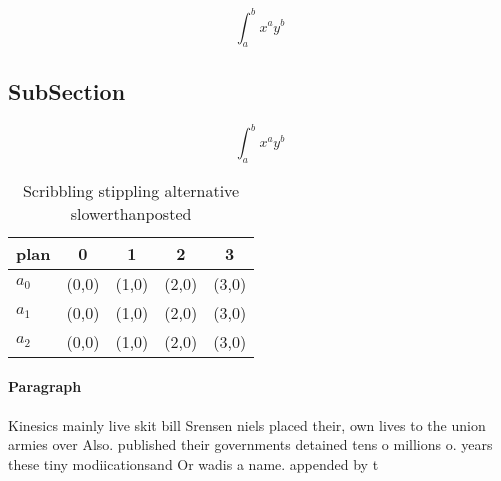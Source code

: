 \documentclass[a4paper]{article}
\begin{document}
\[ \int_{a}^{b}{x^{a}y^{b}} \]

\subsection{SubSection}

\[ \int_{a}^{b}{x^{a}y^{b}} \]

\begin{table}
\begin{adjustbox}{width=0.5\columnwidth}
\begin{tabular}{|l|l|l|l|l|}
\hline
\textbf{plan} & \multicolumn{1}{c|}{\textbf{0}} & \multicolumn{1}{c|}{\textbf{1}} & \multicolumn{1}{c|}{\textbf{2}} & \multicolumn{1}{c|}{\textbf{3}} \\ \hline
\textbf{$a_0$}  & (0,0) & (1,0) & (2,0) & (3,0) \\ \hline
\textbf{$a_1$}  & (0,0) & (1,0) & (2,0) & (3,0) \\ \hline
\textbf{$a_2$}  & (0,0) & (1,0) & (2,0) & (3,0) \\ \hline
\end{tabular}
\end{adjustbox}
\caption{Scribbling stippling alternative slowerthanposted
}
\end{table}

\paragraph{Paragraph}
Kinesics mainly live skit bill Srensen niels placed their, own lives to the union armies over Also. published their governments detained tens o millions o. years these tiny modiicationsand Or wadis a name. appended by t
\end{document}
